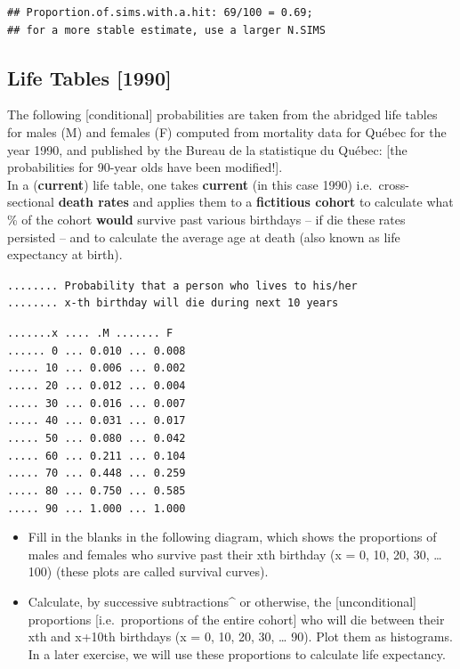 \documentclass[]{book}
\begin{document}
\begin{verbatim}
## Proportion.of.sims.with.a.hit: 69/100 = 0.69;
## for a more stable estimate, use a larger N.SIMS
\end{verbatim}

\hypertarget{life-tables-1990}{%
\subsection{Life Tables {[}1990{]}}\label{life-tables-1990}}

The following {[}conditional{]} probabilities are taken from the
abridged life tables for males (M) and females (F) computed
from mortality data for Québec for the year 1990, and published by the Bureau de la statistique du Québec: {[}the probabilities for 90-year olds have been modified!{]}.\\
In a (\textbf{current}) life table, one takes \textbf{current} (in this case 1990) i.e.~cross-sectional \textbf{death rates} and applies them to a \textbf{fictitious cohort} to calculate what \% of the cohort \textbf{would} survive past various birthdays -- if die these rates persisted -- and to calculate the average age at death (also known as life expectancy at birth).

\texttt{........\ Probability\ that\ a\ person\ who\ lives\ to\ his/her}\\
\texttt{........\ x-th\ birthday\ will\ die\ during\ next\ 10\ years}

\texttt{.......x\ ....\ .M\ .......\ F}~\\
\texttt{......\ 0\ ...\ 0.010\ ...\ 0.008}~\\
\texttt{.....\ 10\ ...\ 0.006\ ...\ 0.002}~\\
\texttt{.....\ 20\ ...\ 0.012\ ...\ 0.004}~\\
\texttt{.....\ 30\ ...\ 0.016\ ...\ 0.007}~\\
\texttt{.....\ 40\ ...\ 0.031\ ...\ 0.017}~\\
\texttt{.....\ 50\ ...\ 0.080\ ...\ 0.042}~\\
\texttt{.....\ 60\ ...\ 0.211\ ...\ 0.104}~\\
\texttt{.....\ 70\ ...\ 0.448\ ...\ 0.259}~\\
\texttt{.....\ 80\ ...\ 0.750\ ...\ 0.585}~\\
\texttt{.....\ 90\ ...\ 1.000\ ...\ 1.000}

\begin{itemize}
\item
  Fill in the blanks in the following diagram, which shows the proportions of males and females who survive past their xth birthday (x = 0, 10, 20, 30, \ldots{} 100) (these plots are called survival curves).
\item
  Calculate, by successive subtractions\^{} or otherwise, the {[}unconditional{]} proportions {[}i.e.~proportions of the entire cohort{]} who will die between their xth and x+10th birthdays (x = 0, 10, 20, 30, \ldots{} 90). Plot them as histograms. In a later exercise, we will use these proportions to calculate life expectancy.
\end{itemize}
\end{document}
